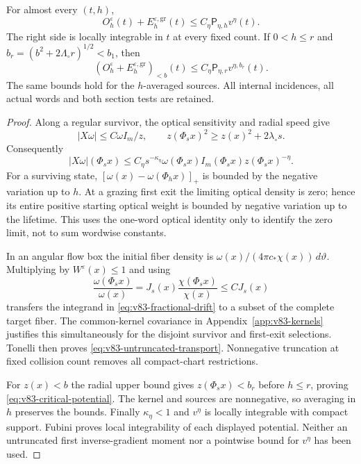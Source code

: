 \begin{theorem}
\label{thm:v83-potential-transport}
For almost every $(t,h)$,
\begin{equation}\label{eq:v83-untruncated-transport}
 O_h^\varepsilon(t)+E_h^{\varepsilon,\mathrm{gr}}(t)
                   \le C_\eta\mathsf P_{\eta,h}v^\eta(t).
\end{equation}
The right side is locally integrable in $t$ at every fixed count.
If $0<h\le r$ and $b_r=(b^2+2\Lambda_\circ r)^{1/2}<b_1$, then
\begin{equation}\label{eq:v83-critical-potential}
 (O_h^\varepsilon+E_h^{\varepsilon,\mathrm{gr}})_{<b}(t)
              \le C_\eta\mathsf P_{\eta,r}v^{\eta,b_r}(t).
\end{equation}
The same bounds hold for the $h$-averaged sources. All internal
incidences, all actual words and both section tests are retained.
\end{theorem}
\begin{proof}
Along a regular survivor, the optical sensitivity and radial speed give
\[
 |X\omega|\le C\omega I_m/z,\qquad
 z(\Phi_sx)^2\ge z(x)^2+2\lambda_\circ s.
\]
Consequently
\begin{equation}\label{eq:v83-fractional-drift}
 |X\omega|(\Phi_sx)
 \le C_\eta s^{-\kappa_\eta}
       \omega(\Phi_sx)I_m(\Phi_sx)z(\Phi_sx)^{-\eta}.
\end{equation}
For a surviving state, $[\omega(x)-\omega(\Phi_hx)]_+$ is bounded
by the negative variation up to $h$. At a grazing first exit the
limiting optical density is zero; hence its entire positive starting
optical weight is bounded by negative variation up to the lifetime.
This uses the one-word optical identity only to identify the zero
limit, not to sum wordwise constants.

In an angular flow box the initial fiber density is
$\omega(x)/(4\pi c_*\chi(x))\,d\vartheta$. Multiplying by
$W^\varepsilon(x)\le1$ and using
\[
 \frac{\omega(\Phi_sx)}{\omega(x)}
       =J_s(x)\frac{\chi(\Phi_sx)}{\chi(x)}\le C J_s(x)
\]
transfers the integrand in \eqref{eq:v83-fractional-drift} to a subset
of the complete target fiber. The common-kernel covariance in
Appendix~\ref{app:v83-kernels} justifies this simultaneously for the
disjoint survivor and first-exit selections. Tonelli then proves
\eqref{eq:v83-untruncated-transport}. Nonnegative truncation at fixed
collision count removes all compact-chart restrictions.

For $z(x)<b$ the radial upper bound gives $z(\Phi_sx)<b_r$ before
$h\le r$, proving \eqref{eq:v83-critical-potential}. The kernel and
sources are nonnegative, so averaging in $h$ preserves the bounds.
Finally $\kappa_\eta<1$ and $v^\eta$ is locally integrable with compact
support. Fubini proves local integrability of each displayed potential.
Neither an untruncated first inverse-gradient moment nor a pointwise
bound for $v^\eta$ has been used.
\end{proof}

